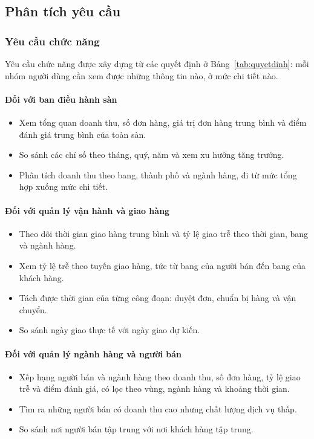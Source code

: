 \subsection{Phân tích yêu cầu}
\subsubsection{Yêu cầu chức năng}

Yêu cầu chức năng được xây dựng từ các quyết định ở Bảng~\ref{tab:quyetdinh}: mỗi nhóm người dùng cần xem được những thông tin nào, ở mức chi tiết nào.

\paragraph{Đối với ban điều hành sàn}
\begin{itemize}
\item Xem tổng quan doanh thu, số đơn hàng, giá trị đơn hàng trung bình và điểm đánh giá trung bình của toàn sàn.
\item So sánh các chỉ số theo tháng, quý, năm và xem xu hướng tăng trưởng.
\item Phân tích doanh thu theo bang, thành phố và ngành hàng, đi từ mức tổng hợp xuống mức chi tiết.
\end{itemize}

\paragraph{Đối với quản lý vận hành và giao hàng}
\begin{itemize}
\item Theo dõi thời gian giao hàng trung bình và tỷ lệ giao trễ theo thời gian, bang và ngành hàng.
\item Xem tỷ lệ trễ theo tuyến giao hàng, tức từ bang của người bán đến bang của khách hàng.
\item Tách được thời gian của từng công đoạn: duyệt đơn, chuẩn bị hàng và vận chuyển.
\item So sánh ngày giao thực tế với ngày giao dự kiến.
\end{itemize}

\paragraph{Đối với quản lý ngành hàng và người bán}
\begin{itemize}
\item Xếp hạng người bán và ngành hàng theo doanh thu, số đơn hàng, tỷ lệ giao trễ và điểm đánh giá, có lọc theo vùng, ngành hàng và khoảng thời gian.
\item Tìm ra những người bán có doanh thu cao nhưng chất lượng dịch vụ thấp.
\item So sánh nơi người bán tập trung với nơi khách hàng tập trung.
\end{itemize}

